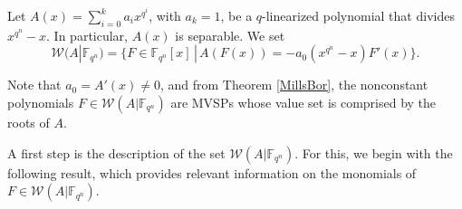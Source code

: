 \documentclass[11pt]{amsart}
\newcommand{\F}{\mathbb{F}}
\theoremstyle{definition}
\theoremstyle{remark}
\begin{document}
Let $A(x)=\sum_{i=0}^ka_ix^{q^{i}}$, with $a_k=1$, be a $q$-linearized polynomial  that divides $x^{q^n}-x$. In particular,  $A(x)$ is separable. We set 
\begin{equation}\label{MVSP-A}
\mathcal W(A|\F_{q^n})=\{F\in \F_{q^n}[x]\,|\, A(F(x))=-a_0(x^{q^n}-x)F'(x)\}.
\end{equation}


Note that  $a_0=A'(x)\neq0$,  and from Theorem \ref{MillsBor}, the nonconstant polynomials $F \in \mathcal W(A|\F_{q^n}) $ are MVSPs whose value set is comprised by the roots of $A$.

A first step  is the description of the set $\mathcal {W}(A|\F_{q^n})$. For this, we begin with the following result, which provides relevant information on  the monomials of $F \in \mathcal W(A|\F_{q^n})$.
\end{document}
